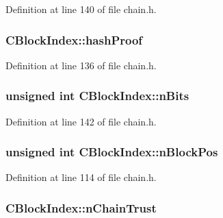 Definition at line 140 of file chain.\+h.

\hypertarget{class_c_block_index_a553e6fc301e8130118d7ec68dce91ee9}{}
\subsubsection[{hash\+Proof}]{ C\+Block\+Index\+::hash\+Proof}\label{class_c_block_index_a553e6fc301e8130118d7ec68dce91ee9}


Definition at line 136 of file chain.\+h.

\hypertarget{class_c_block_index_a3324894e6af612d1bd76f89378435713}{}
\subsubsection[{n\+Bits}]{\setlength{\rightskip}{0pt plus 5cm}unsigned int C\+Block\+Index\+::n\+Bits}\label{class_c_block_index_a3324894e6af612d1bd76f89378435713}


Definition at line 142 of file chain.\+h.

\hypertarget{class_c_block_index_af8de5426e2da2c78e1e7729a89a7670a}{}
\subsubsection[{n\+Block\+Pos}]{\setlength{\rightskip}{0pt plus 5cm}unsigned int C\+Block\+Index\+::n\+Block\+Pos}\label{class_c_block_index_af8de5426e2da2c78e1e7729a89a7670a}


Definition at line 114 of file chain.\+h.

\hypertarget{class_c_block_index_aa11268e5a01c5a7d33fb313fb0494015}{}
\subsubsection[{n\+Chain\+Trust}]{ C\+Block\+Index\+::n\+Chain\+Trust}\label{class_c_block_index_aa11268e5a01c5a7d33fb313fb0494015}


